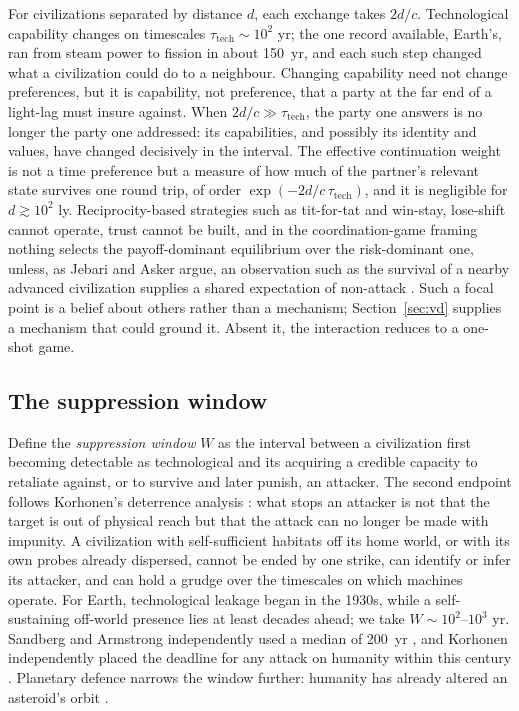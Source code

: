 \documentclass[preprint,12pt]{elsarticle}
\theoremstyle{definition}
\begin{document}
For civilizations separated by distance $d$, each exchange takes $2d/c$. Technological capability changes on timescales $\tau_{\text{tech}} \sim 10^{2}$ yr; the one record available, Earth's, ran from steam power to fission in about 150~yr, and each such step changed what a civilization could do to a neighbour. Changing capability need not change preferences, but it is capability, not preference, that a party at the far end of a light-lag must insure against. When $2d/c \gg \tau_{\text{tech}}$, the party one answers is no longer the party one addressed: its capabilities, and possibly its identity and values, have changed decisively in the interval. The effective continuation weight is not a time preference but a measure of how much of the partner's relevant state survives one round trip, of order $\exp(-2d/c\,\tau_{\text{tech}})$, and it is negligible for $d \gtrsim 10^{2}$ ly. Reciprocity-based strategies such as tit-for-tat and win-stay, lose-shift \citep{NowakSigmund1993} cannot operate, trust cannot be built, and in the coordination-game framing nothing selects the payoff-dominant equilibrium over the risk-dominant one, unless, as Jebari and Asker argue, an observation such as the survival of a nearby advanced civilization supplies a shared expectation of non-attack \citep{JebariAsker2024}. Such a focal point is a belief about others rather than a mechanism; Section~\ref{sec:vd} supplies a mechanism that could ground it. Absent it, the interaction reduces to a one-shot game.

\subsection{The suppression window}
\label{sec:window}

Define the \emph{suppression window} $W$ as the interval between a civilization first becoming detectable as technological and its acquiring a credible capacity to retaliate against, or to survive and later punish, an attacker. The second endpoint follows Korhonen's deterrence analysis \citep{Korhonen2013}: what stops an attacker is not that the target is out of physical reach but that the attack can no longer be made with impunity. A civilization with self-sufficient habitats off its home world, or with its own probes already dispersed, cannot be ended by one strike, can identify or infer its attacker, and can hold a grudge over the timescales on which machines operate. For Earth, technological leakage began in the 1930s, while a self-sustaining off-world presence lies at least decades ahead; we take $W \sim 10^{2}$--$10^{3}$ yr. Sandberg and Armstrong independently used a median of 200~yr \citep{SandbergArmstrong2013}, and Korhonen independently placed the deadline for any attack on humanity within this century \citep{Korhonen2013}. Planetary defence narrows the window further: humanity has already altered an asteroid's orbit \citep{Daly2023}.
\end{document}
